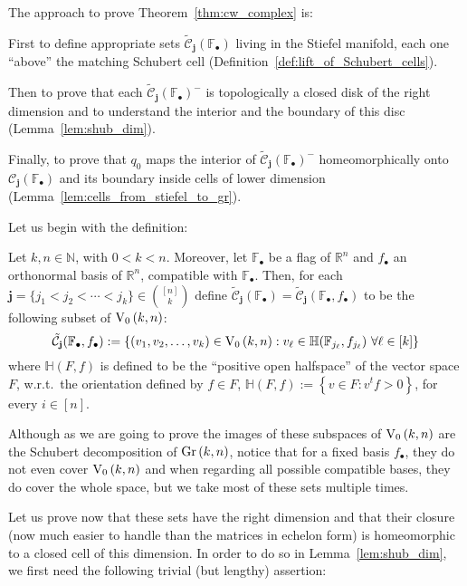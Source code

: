 The approach to prove Theorem~\ref{thm:cw_complex} is:
\begin{i_enum}
\item First to define appropriate sets $\tilde{\mathcal{C}}_{\mathbf{j}}(\mathbb{F}_{\bullet})$ living in the Stiefel manifold, each one ``above'' the matching Schubert cell (Definition~\ref{def:lift_of_Schubert_cells}).
\item Then to prove that each $\tilde{\mathcal{C}}_{\mathbf{j}}{\left(\mathbb{F}_{\bullet}\right)}^-$ is topologically a closed disk of the right dimension and to understand the interior and the boundary of this disc (Lemma~\ref{lem:shub_dim}).
\item Finally, to prove that $q_0$ maps the interior of $\tilde{\mathcal{C}}_{\mathbf{j}}(\mathbb{F}_{\bullet})^-$ homeomorphically onto $\mathcal{C}_{\mathbf{j}}(\mathbb{F}_{\bullet})$ and its boundary inside cells of lower dimension (Lemma~\ref{lem:cells_from_stiefel_to_gr}).
\end{i_enum}
Let us begin with the definition:

\begin{definition}\label{def:lift_of_Schubert_cells} Let $k,n\in\mathbb{N}$, with $0<k<n$. Moreover, let $\mathbb{F}_{\bullet}$ be a flag of $\mathbb{R}^n$ and $f_{\bullet}$ an orthonormal basis of $\mathbb{R}^n$, compatible with $\mathbb{F}_{\bullet}$. Then, for each $\mathbf{j}=\{j_1<j_2<\cdots<j_k\}\in\binom{[n]}{k}$ define $\tilde{\mathcal{C}}_{\mathbf{j}}(\mathbb{F}_{\bullet})=\tilde{\mathcal{C}}_{\mathbf{j}}(\mathbb{F}_{\bullet},f_{\bullet})$ to be the following subset of $\StO{k}{n}$:
\[\tilde{\mathcal{C}}_{\mathbf{j}}(\mathbb{F}_{\bullet},f_{\bullet}):=\left\{(v_1,v_2,\ldots,v_k)\in\StO{k}{n}:v_{\ell}\in\mathbb{H}(\mathbb{F}_{j_{\ell}},f_{j_{\ell}})\ \forall\ell\in[k]\right\}\]
where $\mathbb{H}(F,f)$ is defined to be the ``positive open halfspace'' of the vector space $F$, w.r.t.\ the orientation defined by $f\in F$,
$\mathbb{H}(F,f):=\left\{v\in F:v^tf>0\right\}$,
for every $i\in[n]$.
\end{definition}

Although as we are going to prove the images of these subspaces of $\StO{k}{n}$ are the Schubert decomposition of $\Gr{k}{n}$, notice that for a fixed basis $f_{\bullet}$, they do not even cover $\StO{k}{n}$ and when regarding all possible compatible bases, they do cover the whole space, but we take most of these sets multiple times.

Let us prove now that these sets have the right dimension and that their closure (now much easier to handle than the matrices in echelon form) is homeomorphic to a closed cell of this dimension. In order to do so in Lemma~\ref{lem:shub_dim}, we first need the following trivial (but lengthy) assertion:

